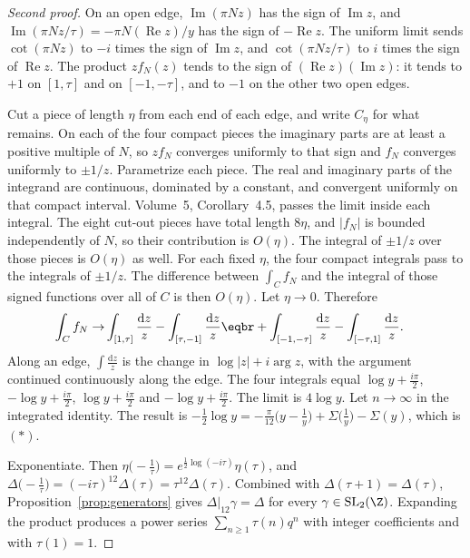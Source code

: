 \begin{proof}[Second proof]
On an open edge, $\operatorname{Im}(\pi Nz)$ has the sign of $\operatorname{Im}z$, and $\operatorname{Im}(\pi Nz/\tau)=-\pi N(\operatorname{Re}z)/y$ has the sign of $-\operatorname{Re}z$. The uniform limit sends $\cot(\pi Nz)$ to $-i$ times the sign of $\operatorname{Im}z$, and $\cot(\pi Nz/\tau)$ to $i$ times the sign of $\operatorname{Re}z$. The product $zf_N(z)$ tends to the sign of $(\operatorname{Re}z)(\operatorname{Im}z)$: it tends to $+1$ on $[1,\tau]$ and on $[-1,-\tau]$, and to $-1$ on the other two open edges.

Cut a piece of length $\eta$ from each end of each edge, and write $C_\eta$ for what remains. On each of the four compact pieces the imaginary parts are at least a positive multiple of $N$, so $zf_N$ converges uniformly to that sign and $f_N$ converges uniformly to $\pm1/z$. Parametrize each piece. The real and imaginary parts of the integrand are continuous, dominated by a constant, and convergent uniformly on that compact interval. Volume~5, Corollary~4.5, passes the limit inside each integral. The eight cut-out pieces have total length $8\eta$, and $|f_N|$ is bounded independently of $N$, so their contribution is $O(\eta)$. The integral of $\pm1/z$ over those pieces is $O(\eta)$ as well. For each fixed $\eta$, the four compact integrals pass to the integrals of $\pm1/z$. The difference between $\int_Cf_N$ and the integral of those signed functions over all of $C$ is then $O(\eta)$. Let $\eta\to0$. Therefore
\[
\begin{aligned}\int_Cf_N\to&\int_{[1,\tau]}\frac{\mathrm dz}z-\int_{[\tau,-1]}\frac{\mathrm dz}z\eqbr+\int_{[-1,-\tau]}\frac{\mathrm dz}z-\int_{[-\tau,1]}\frac{\mathrm dz}z.\end{aligned}
\]
Along an edge, $\int\frac{\mathrm dz}z$ is the change in $\log|z|+i\arg z$, with the argument continued continuously along the edge. The four integrals equal $\log y+\frac{i\pi}2$, $-\log y+\frac{i\pi}2$, $\log y+\frac{i\pi}2$ and $-\log y+\frac{i\pi}2$. The limit is $4\log y$. Let $n\to\infty$ in the integrated identity. The result is $-\frac12\log y=-\frac\pi{12}\bigl(y-\frac1y\bigr)+\Sigma\bigl(\frac1y\bigr)-\Sigma(y)$, which is $(\ast)$.

Exponentiate. Then $\eta\bigl(-\frac1\tau\bigr)=e^{\frac12\log(-i\tau)}\eta(\tau)$, and $\Delta\bigl(-\frac1\tau\bigr)=(-i\tau)^{12}\Delta(\tau)=\tau^{12}\Delta(\tau)$. Combined with $\Delta(\tau+1)=\Delta(\tau)$, Proposition~\ref{prop:generators} gives $\Delta|_{12}\gamma=\Delta$ for every $\gamma\in\mathrm{SL}_2(\Z)$. Expanding the product produces a power series $\sum_{n\ge1}\tau(n)q^n$ with integer coefficients and with $\tau(1)=1$.
\end{proof}

